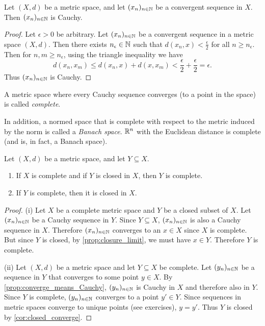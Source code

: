 \documentclass{article}
\begin{document}
\begin{proposition}
\label{prop:converge_means_Cauchy}
Let $(X, d)$ be a metric space, and let $(x_n)_{n\in{\mathbb{N}}}$ be a convergent sequence in $X$. Then  $(x_n)_{n\in{\mathbb{N}}}$ is Cauchy.
\end{proposition}

\begin{proof}
Let $\epsilon > 0$ be arbitrary. Let $(x_n)_{n\in{\mathbb{N}}}$ be a convergent sequence in a metric space $(X,d)$. Then there exists $n_\epsilon \in {\mathbb{N}}$ such that $d(x_n,x) < \frac{\epsilon}{2}$ for all $n \geq n_\epsilon$. Then for $n,m \geq n_\epsilon$, using the triangle inequality we have
\begin{equation*}
    d(x_n,x_m) \leq  d(x_n,x) +  d(x,x_m) < \frac{\epsilon}{2} + \frac{\epsilon}{2} = \epsilon .
\end{equation*}
Thus $(x_n)_{n\in{\mathbb{N}}}$ is Cauchy.
\end{proof}

\begin{definition}
A metric space where every Cauchy sequence converges (to a point in the space) is called \emph{complete}.
\end{definition}

In addition, a normed space that is complete with respect to the metric induced by the norm is called a \emph{Banach space}. ${\mathbb{R}}^n$ with the Euclidean distance is complete (and is, in fact, a Banach space). 

\begin{proposition}
\label{prop:closed_subset_complete}
Let $(X, d)$ be a metric space, and let $Y\subseteq X$.
\begin{enumerate}
    \item[(i)] If $X$ is complete and if $Y$ is closed in $X$, then $Y$ is complete.
    \item[(ii)] If $Y$ is complete, then it is closed in $X$.
\end{enumerate}
\end{proposition}

\begin{proof}
(i) Let $X$ be a complete metric space and $Y$ be a closed subset of $X$. Let $(x_n)_{n\in{\mathbb{N}}}$ be a Cauchy sequence in $Y$. Since $Y \subseteq X$, $(x_n)_{n\in{\mathbb{N}}}$ is also a Cauchy sequence in $X$. Therefore $(x_n)_{n\in{\mathbb{N}}}$ converges to an $x \in X$ since $X$ is complete. But since $Y$ is closed, by \cref{prop:closure_limit}, we must have $x \in Y$. Therefore $Y$ is complete.

(ii) Let $(X, d)$ be a metric space and let $Y\subseteq X$ be complete. Let $(y_n)_{n\in{\mathbb{N}}}$ be a sequence in $Y$ that converges to some point $y \in X$.  By \cref{prop:converge_means_Cauchy},  $(y_n)_{n\in{\mathbb{N}}}$ is Cauchy in $X$ and therefore also in $Y$. Since $Y$ is complete, $(y_n)_{n\in{\mathbb{N}}}$ converges to a point $y' \in Y$. Since sequences in metric spaces converge to unique points (see exercises), $y=y'$. Thus $Y$ is closed by \cref{cor:closed_converge}.
\end{proof}
\end{document}
